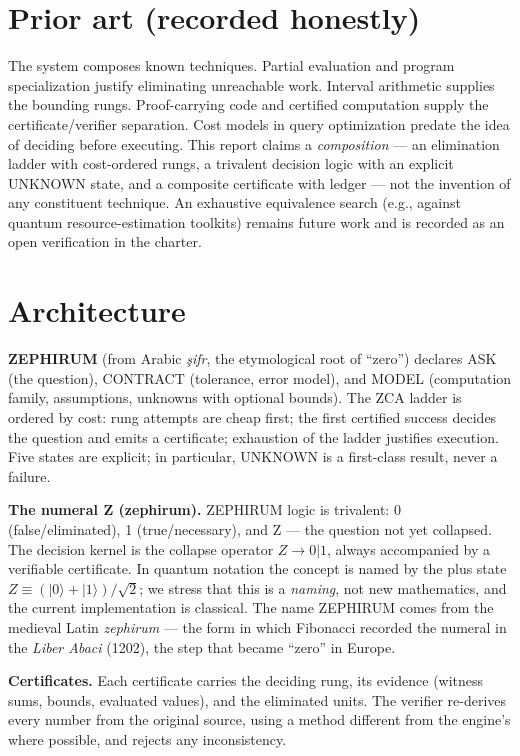 \documentclass[11pt,a4paper]{article}
\begin{document}
\section{Prior art (recorded honestly)}
The system composes known techniques. Partial evaluation and program
specialization justify eliminating unreachable work. Interval arithmetic
supplies the bounding rungs. Proof-carrying code and certified computation
supply the certificate/verifier separation. Cost models in query optimization
predate the idea of deciding before executing. This report claims a
\emph{composition} --- an elimination ladder with cost-ordered rungs, a
trivalent decision logic with an explicit UNKNOWN state, and a composite
certificate with ledger --- not the invention of any constituent technique. An
exhaustive equivalence search (e.g., against quantum resource-estimation
toolkits) remains future work and is recorded as an open verification in the
charter.

\section{Architecture}
\textbf{ZEPHIRUM} (from Arabic \emph{\c{s}ifr}, the etymological root of
``zero'') declares ASK (the question), CONTRACT (tolerance, error model), and
MODEL (computation family, assumptions, unknowns with optional bounds). The
ZCA ladder is ordered by cost: rung attempts are cheap first; the first
certified success decides the question and emits a certificate; exhaustion of
the ladder justifies execution. Five states are explicit; in particular,
UNKNOWN is a first-class result, never a failure.

\textbf{The numeral Z (zephirum).} ZEPHIRUM logic is trivalent: 0
(false/eliminated), 1 (true/necessary), and Z --- the question not yet
collapsed. The decision kernel is the collapse operator $Z \to 0|1$, always
accompanied by a verifiable certificate. In quantum notation the concept is
named by the plus state $Z \equiv (|0\rangle+|1\rangle)/\sqrt{2}$; we stress
that this is a \emph{naming}, not new mathematics, and the current
implementation is classical. The name ZEPHIRUM comes from the medieval Latin
\emph{zephirum} --- the form in which Fibonacci recorded the numeral in the
\emph{Liber Abaci} (1202), the step that became ``zero'' in Europe.

\textbf{Certificates.} Each certificate carries the deciding rung, its
evidence (witness sums, bounds, evaluated values), and the eliminated units.
The verifier re-derives every number from the original source, using a method
different from the engine's where possible, and rejects any inconsistency.
\end{document}
